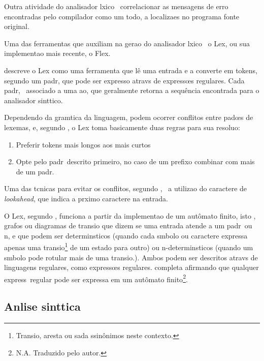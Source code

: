 Outra atividade do analisador l\eh xico \eh\ correlacionar as mensagens de erro encontradas pelo compilador como um todo, a localiza\co es no programa fonte original.



Uma das ferramentas que auxiliam na gera\ca o do analisador l\eh xico \eh\ o Lex, ou sua implementa\ca o mais recente, o Flex.

\cite{Niemann10} descreve o Lex como uma ferramenta que l\^e uma entrada e a converte em tokens, segundo um padr\ao, que pode ser expresso atrav\eh s de express\oe s regulares. Cada padr\ao, \eh\ associado a uma a\ca o, que geralmente retorna a sequ\^encia encontrada para o analisador sint\ah tico.

Dependendo da gram\ah tica da linguagem, podem ocorrer conflitos entre pad\oe s de lexemas, e, segundo \cite{Aho08}, o Lex toma basicamente duas regras para sua resolu\ca o:

\begin{enumerate}
\item Preferir tokens mais longos aos mais curtos
\item Opte pelo padr\ao\ descrito primeiro, no caso de um prefixo combinar com mais de um padr\ao.
\end{enumerate}

Uma das t\eh cnicas para evitar os conflitos, segundo \cite{Aho08}, \eh\ a utiliza\ca o do caractere de \emph{lookahead}, que indica a pr\oh ximo caractere na entrada.

O Lex, segundo \cite{Aho08}, funciona a partir da implementa\ca o de um aut\^omato finito, isto \eh, grafos ou diagramas de transi\ca o que dizem se uma entrada atende a um padr\ao\ ou n\ao, e que podem ser determin\ih sticos (quando cada s\ih mbolo ou caractere expressa apenas uma transi\ca o\footnote{Transi\ca o, aresta ou sa\ih da s\ao sin\^onimos neste contexto.} de um estado para outro) ou n\ao-determin\ih sticos (quando um s\ih mbolo pode rotular mais de uma transi\ca o.). Ambos podem ser descritos atrav\eh s de linguagens regulares, como express\oe s regulares. \cite{Niemann10} completa afirmando que qualquer express\ao\ regular pode ser expressa em um aut\^omato finito\footnote{N.A. Traduzido pelo autor.}.


\subsection{An\ah lise sint\ah tica}

